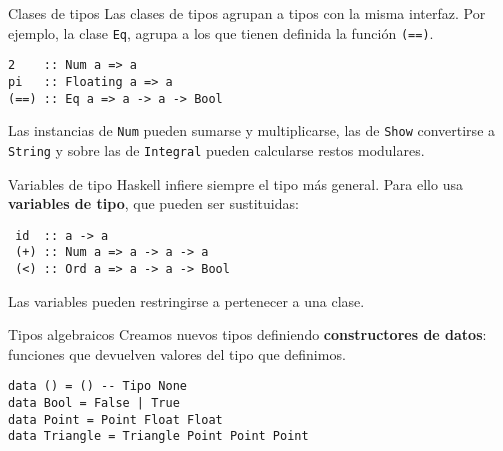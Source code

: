 \begin{frame}[fragile]{Clases de tipos}
Las clases de tipos agrupan a tipos con la misma interfaz.
Por ejemplo, la clase \texttt{Eq}, agrupa a los que tienen
definida la función \texttt{(==)}.

\espacio

\begin{lstlisting}
2    :: Num a => a
pi   :: Floating a => a
(==) :: Eq a => a -> a -> Bool
\end{lstlisting}

\espacio

Las instancias de \texttt{Num} pueden sumarse y multiplicarse,
las de \texttt{Show} convertirse a \texttt{String}
y sobre las de \texttt{Integral} pueden calcularse restos modulares.

\end{frame}

\begin{frame}[fragile]{Variables de tipo}
  Haskell infiere siempre el tipo más general.
  Para ello usa \textbf{variables de tipo}, que pueden ser sustituidas:

  \espacio

  \begin{lstlisting}
 id  :: a -> a
 (+) :: Num a => a -> a -> a
 (<) :: Ord a => a -> a -> Bool
  \end{lstlisting}

  \espacio

  Las variables pueden restringirse a pertenecer a una clase.


\end{frame}

\begin{frame}[fragile]{Tipos algebraicos}
  Creamos nuevos tipos definiendo \textbf{constructores de datos}: funciones que
  devuelven valores del tipo que definimos.

  \espacio

  \begin{lstlisting}
data () = () -- Tipo None
data Bool = False | True
data Point = Point Float Float
data Triangle = Triangle Point Point Point
  \end{lstlisting}

\end{frame}

